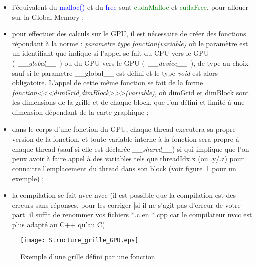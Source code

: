 \documentclass[a4paper,12pt]{article}
\begin{document}
{    \begin{itemize}
        \item l'\'e{}quivalent du \textcolor{blue}{malloc()} et du \textcolor{blue}{free} sont \textcolor{green}{cudaMalloc} et \textcolor{green}{cudaFree}, pour allouer sur la Global Memory ;
        \item pour effectuer des calculs sur le GPU, il est n\'e{}cessaire de cr\'e{}er des fonctions r\'e{}pondant \`a la norme : \textit{parametre type fonction(variable)} o\`u le param\`etre est un identifiant que indique si l'appel se fait du CPU vers le GPU (~\textit{\_\_global\_\_}~) ou du GPU vers le GPU (~\textit{\_\_device\_\_}~), de type au choix sauf si le parametre \_\_global\_\_ est d\'e{}fini et le type \textit{void} est alors obligatoire. L'appel de cette m\^eme fonction se fait de la forme \textit{fonction<{}<{}<dimGrid,dimBlock>{}>{}>(variable)}, o\`u dimGrid et dimBlock sont les dimensions de la grille et de chaque block, que l'on défini et limit\'e \`a une dimension d\'e{}pendant de la carte graphique ;
        \item dans le corps d'une fonction du GPU, chaque thread executera sa propre version de la fonction, et toute variable interne \`a la fonction sera propre \`a chaque thread (sauf si elle est d\'e{}clar\'e{}e \textit{\_\_shared\_\_}) si qui implique que l'on peux avoir \`a faire appel \`a des variables tels que threadIdx.x (ou .y/.z) pour connaitre l'emplacement du thread dans son block (voir figure~\ref{fig:structGrid} pour un exemple) ;
        \item la compilation se fait avec nvcc (il est possible que la compilation est des erreurs sans r\'e{}ponses, pour les corriger [si il ne s'agit pas d'erreur de votre part] il suffit de renommer vos fichiers *.c en *.cpp car le compilateur nvcc est plus adapt\'e au C++ qu'au C).
    \end{itemize}
	\begin{figure}
	    \centering
	    \caption{Exemple d'une grille d\'e{}fini par une fonction}
	    \label{fig:structGrid}
	    \texttt{[image: Structure\_grille\_GPU.eps]}
	\end{figure}
}
\end{document}

